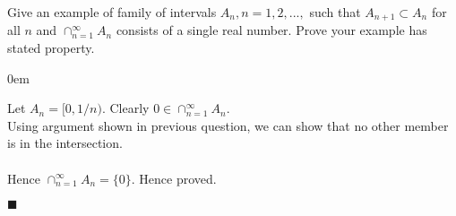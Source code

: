 \documentclass[12pt]{article}
\renewcommand{\qed}{\hfill$\blacksquare$}
\renewenvironment{proof}{\begin{addmargin}[1em]{0em}\begin{newproof}}{\end{newproof}\end{addmargin}\qed}
\newenvironment{problem}[2][Problem]{\begin{trivlist}
\item[\hskip \labelsep {\bfseries #1}\hskip \labelsep {\bfseries #2.}]}{\end{trivlist}}
\begin{document}
\begin{problem}{10} Give an example of family of intervals $A_n, n=1,2,...,$ such that $A_{n+1} \subset A_n$ for all $n$ and $\cap_{n=1}^{\infty} A_n$ consists of a single real number. Prove your example has stated property.
\end{problem}

\begin{proof}
Let $A_n = [0,1/n)$. Clearly $0 \in \cap_{n=1}^{\infty} A_n$. \\ 
Using argument shown in previous question, we can show  that no other member is in the intersection. \\ \\
Hence $\cap_{n=1}^{\infty} A_n = \{0\}$.
Hence proved.
\end{proof}
 \\
 \\
 

 
\end{document}
